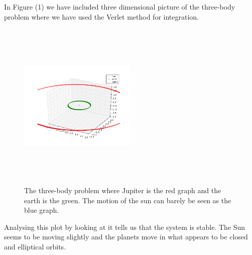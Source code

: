 \documentclass[%
 reprint,
 nobalance,
 amsmath,amssymb,
 aps,
]{revtex4-1}
\begin{document}
In Figure (1) we have included three dimensional picture of the three-body problem where we have used the Verlet method for integration.

\begin{figure}[h]
\centering
\includegraphics[height=3.2in, width=0.5\textwidth]{plot/earth_sun_jupiter_mj1.png} \caption{The three-body problem where Jupiter is the red graph and the earth is the green. The motion of the sun can barely be seen as the blue graph.}
\end{figure}

Analysing this plot by looking at it tells us that the system is stable. The Sun seems to be moving slightly and the planets move in what appears to be closed and elliptical orbits.
\end{document}
